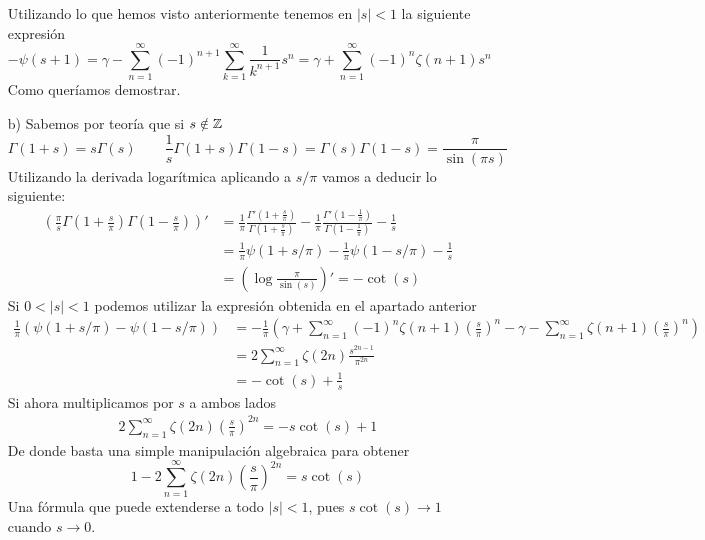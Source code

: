 \documentclass[twoside]{article}
\begin{document}
\begin{sol}
\begin{itemize}
$$$$
Utilizando lo que hemos visto anteriormente tenemos en $|s|<1$ la siguiente expresión
$$
-\psi(s+1) = \gamma -  \sum_{n=1}^\infty(-1)^{n+1}\sum_{k=1}^\infty\frac{1}{k^{n+1}}  s^n = \gamma + \sum_{n=1}^\infty(-1)^{n}\zeta(n+1) s^n
$$
Como queríamos demostrar.
\newpage
\item[b)] Sabemos por teoría que si $s\notin \mathbb{Z}$
$$\Gamma(1+s)=s\Gamma(s)  \qquad \frac{1}{s}\Gamma(1+s)\Gamma(1-s)= 	\Gamma(s)\Gamma(1-s)=\frac{\pi}{\sin(\pi s)} \qquad 
$$
Utilizando la derivada logarítmica aplicando a $s/\pi$ vamos a deducir lo siguiente:
\begin{align*}
\left(\frac{\pi}{s}\Gamma\left(1+\frac{s}{\pi}\right)\Gamma\left(1-\frac{s}{\pi}\right)\right)' & = \frac{1}{\pi}\frac{\Gamma'\left(1+\frac{s}{\pi}\right)}{\Gamma\left(1+\frac{s}{\pi}\right)} - \frac{1}{\pi}\frac{\Gamma'(1-\frac{1}{\pi})}{\Gamma(1-\frac{1}{\pi})} - \frac{1}{s}\\
 &= \frac{1}{\pi}\psi(1+s/\pi)-\frac{1}{\pi}\psi(1-s/\pi) - \frac{1}{s}\\
&=\left(\log\frac{\pi}{\sin(s)}\right)'  = -\cot(s)
\end{align*}
Si $0<|s|<1$ podemos utilizar la expresión obtenida en el apartado anterior
\begin{align*}
\frac{1}{\pi}\left(\psi(1+s/\pi)-\psi(1-s/\pi)\right) &=  -\frac{1}{\pi}\left(\gamma+ \sum_{n=1}^\infty(-1)^{n}\zeta(n+1) \left(\frac{s}{\pi}\right)^n -  \gamma - \sum_{n=1}^\infty\zeta(n+1) \left(\frac{s}{\pi}\right)^n\right)\\
&=2\sum_{n=1}^\infty \zeta(2n)\frac{s^{2n-1}}{\pi^{2n}}\\
&=-\cot(s)+\frac{1}{s}
\end{align*}
Si ahora multiplicamos por $s$ a ambos lados
\begin{gather*}
2\sum_{n=1}^\infty \zeta(2n)\left(\frac{s}{\pi}\right)^{2n}=-s\cot(s)+1 
\end{gather*}
De donde basta una simple manipulación algebraica para obtener
$$
1-2\sum_{n=1}^\infty \zeta(2n)\left(\frac{s}{\pi}\right)^{2n}=s\cot(s)
$$
Una fórmula que puede extenderse a todo $|s|<1$, pues $s\cot(s)\to 1$ cuando $s\to 0$.
\end{itemize}
\end{sol}
\newpage
\end{document}
